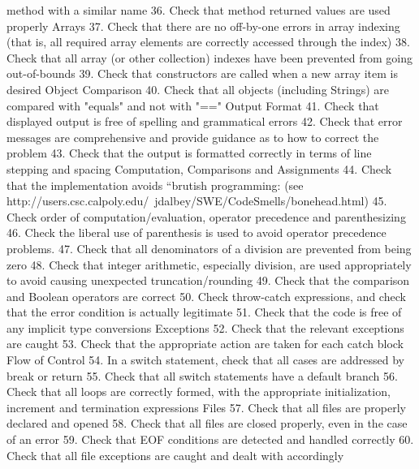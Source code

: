 method	with	a	similar	name
36. Check	that method	returned values	are	used	properly	
Arrays
37. Check	 that there	 are	 no	 off-by-one	 errors	 in	 array	 indexing (that	 is,	 all	
required	array	elements are correctly	accessed	through	the	index)
38. Check	 that all	 array	 (or	 other	 collection)	 indexes	 have	 been	 prevented	
from	going	out-of-bounds
39. Check	that constructors	are called	when	a	new	array	item	is	desired
Object	Comparison
40. Check	that all	objects	(including	Strings)	are	compared	with	"equals"	and	
not with "=="
Output	Format
41. Check	that displayed	output	is	free	of	spelling	and	grammatical	errors
42. Check	that error	messages	are	comprehensive	and	provide	guidance	as to	
how	to	correct	the	problem
43. Check	that the	output is formatted	correctly	in	terms	of	line	stepping	and	
spacing
Computation,	Comparisons	and	Assignments
44. Check	 that the	 implementation	 avoids “brutish	 programming:	 (see	
http://users.csc.calpoly.edu/~jdalbey/SWE/CodeSmells/bonehead.html)
45. Check	 order	 of	 computation/evaluation,	 operator	 precedence	 and	
parenthesizing	
46. Check	the	liberal	use	of	parenthesis	is	used	to	avoid	operator	precedence	
problems.
47. Check	that all	denominators	of	a	division	are	prevented	from	being	zero
48. Check	 that integer	arithmetic,	especially	division,	are	used	appropriately	
to	avoid	causing unexpected	truncation/rounding
49. Check	that the	comparison and	Boolean operators	are	correct
50. Check	 throw-catch	 expressions,	 and	 check	 that the	 error	 condition	 is	
actually	legitimate	
51. Check	that the	code is free	of any	implicit type	conversions
Exceptions
52. Check	that the	relevant	exceptions	are	caught
53. Check	that the	appropriate	action are taken	for	each	catch	block	
Flow	of	Control
54. In	 a	 switch	 statement,	 check	 that all	 cases	 are	 addressed	 by	 break	 or	
return
55. Check	that all	switch statements	have	a	default	branch
56. Check	 that all	 loops are correctly	 formed,	 with	 the	 appropriate	
initialization,	increment	and	termination	expressions
Files
57. Check	that all	files	are	properly	declared	and	opened
58. Check	that all	files	are	closed	properly,	even	in	the	case	of	an	error
59. Check	that EOF	conditions	are	detected	and	handled	correctly
60. Check	that	all	file	exceptions	are	caught	and	dealt	with	accordingly